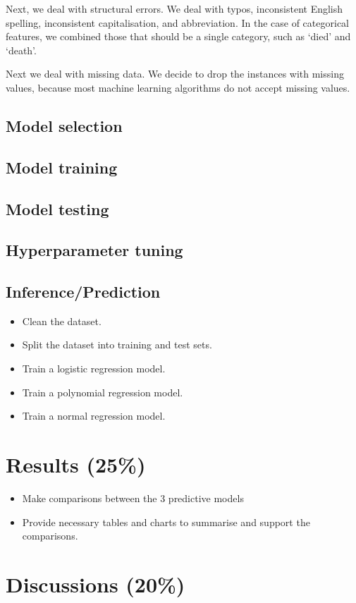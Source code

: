 \documentclass[twoside,11pt]{article}
\begin{document}
Next, we deal with structural errors. We deal with typos, inconsistent English spelling, inconsistent capitalisation, and abbreviation. In the case of categorical features, we combined those that should be a single category, such as `died' and `death'.

Next we deal with missing data. We decide to drop the instances with missing values, because most machine learning algorithms do not accept missing values.

\subsection{Model selection}
\subsection{Model training}
\subsection{Model testing}
\subsection{Hyperparameter tuning}
\subsection{Inference/Prediction}
\begin{itemize}
    \item Clean the dataset.
    \item Split the dataset into training and test sets.
    \item Train a logistic regression model.
    \item Train a polynomial regression model.
    \item Train a normal regression model.
\end{itemize}

\section{Results (25\%)}
\begin{itemize}
    \item Make comparisons between the 3 predictive models
    \item Provide necessary tables and charts to summarise and support the comparisons.
\end{itemize}

\section{Discussions (20\%)}
\end{document}
